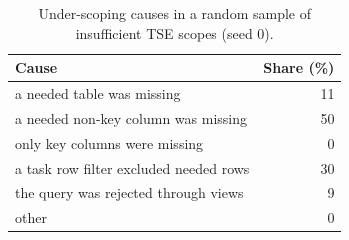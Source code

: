 \begin{table}[h]\centering\caption{Under-scoping causes in a random sample of insufficient TSE scopes (seed 0).}\label{tab:taxonomy}
\small\begin{tabular}{lr}\hline\textbf{Cause} & \textbf{Share (\%)} \\\hline
a needed table was missing & 11 \\
a needed non-key column was missing & 50 \\
only key columns were missing & 0 \\
a task row filter excluded needed rows & 30 \\
the query was rejected through views & 9 \\
other & 0 \\
\hline\end{tabular}\end{table}
